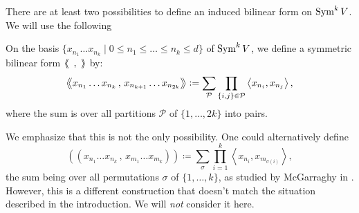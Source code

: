 There are at least two possibilities to define an induced bilinear form on $\operatorname{Sym}^kV$. We will use the following
\begin{definition} \label{formdef} On the basis $\{x_{n_1}\ldots x_{n_k}\;|\;0\leq n_1\leq\ldots\leq n_k\leq d\}$ of $\operatorname{Sym}^kV$, we define a symmetric bilinear form $\left<\!\!\!\:\left<\ \,,\ \right>\!\!\!\:\right>$ by: 
\begin{equation}
\label{mydef}
\left<\!\!\!\:\left< x_{n_1}\ldots x_{n_k}\,,\,x_{n_{k+1}}\ldots x_{n_{2k}} \right>\!\!\!\:\right> \vcentcolon= \sum_{\mathcal{P}} \prod_{\{i,j\}\in\mathcal{P}} \left<x_{n_i},x_{n_j}\right>,
\end{equation}
where the sum is over all partitions $\mathcal{P}$ of $\{1,\ldots,2k\}$ into pairs.
\end{definition}

We emphasize that this is not the only possibility. One could alternatively define
\begin{equation}\label{Garr}
\left(\!\left( x_{n_1}\ldots x_{n_k}\,,\, x_{m_1}\ldots x_{m_k}\right)\!\right) \coloneqq \sum_\sigma  
\prod_{i=1}^k \left< x_{n_i},x_{m_{\sigma(i)}}\right>,
\end{equation}
the sum being over all permutations $\sigma$ of $\{1,\ldots,k\}$, as studied by McGarraghy in \cite{McGarr}. However, this is a different construction that doesn't match the situation described in the introduction. We will \emph{not} consider it here.

